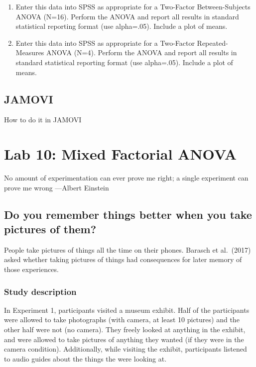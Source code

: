 \documentclass[
]{book}
\begin{document}
\begin{enumerate}
\def\labelenumi{\arabic{enumi}.}
\item
  Enter this data into SPSS as appropriate for a Two-Factor Between-Subjects ANOVA (N=16). Perform the ANOVA and report all results in standard statistical reporting format (use alpha=.05). Include a plot of means.
\item
  Enter this data into SPSS as appropriate for a Two-Factor Repeated-Measures ANOVA (N=4). Perform the ANOVA and report all results in standard statistical reporting format (use alpha=.05). Include a plot of means.
\end{enumerate}

\hypertarget{jamovi-2}{%
\section{JAMOVI}\label{jamovi-2}}

How to do it in JAMOVI

\hypertarget{lab-10-mixed-factorial-anova}{%
\chapter{Lab 10: Mixed Factorial ANOVA}\label{lab-10-mixed-factorial-anova}}

{
No amount of experimentation can ever prove me right; a single experiment can prove me wrong
---Albert Einstein
}

\hypertarget{do-you-remember-things-better-when-you-take-pictures-of-them}{%
\section{Do you remember things better when you take pictures of them?}\label{do-you-remember-things-better-when-you-take-pictures-of-them}}

People take pictures of things all the time on their phones. Barasch et al.~(2017) asked whether taking pictures of things had consequences for later memory of those experiences.

\hypertarget{study-description-5}{%
\subsection{Study description}\label{study-description-5}}

In Experiment 1, participants visited a museum exhibit. Half of the participants were allowed to take photographs (with camera, at least 10 pictures) and the other half were not (no camera). They freely looked at anything in the exhibit, and were allowed to take pictures of anything they wanted (if they were in the camera condition). Additionally, while visiting the exhibit, participants listened to audio guides about the things the were looking at.
\end{document}
